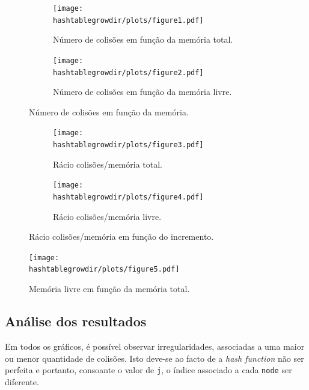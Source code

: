 \documentclass[portuguese,11pt,a4paper,titlepage]{article}
\newcommand{\srcdir}{..}
\newcommand{\hashtablegrowdir}{\srcdir/hash\_table\_grow-test}
\begin{document}
\begin{figure}[h]
	\begin{subfigure}{0.47\textwidth}
		\texttt{[image: \\hashtablegrowdir/plots/figure1.pdf]} 
		\caption{Número de colisões em função da memória total.}
		\label{fig:htg_col_mem_total}
	\end{subfigure}
	\hspace{0.049\textwidth}
	\begin{subfigure}{0.47\textwidth}
		\texttt{[image: \\hashtablegrowdir/plots/figure2.pdf]}
		\caption{Número de colisões em função da memória livre.}
		\label{fig:htg_col_mem_free}
	\end{subfigure}
	
	\caption{Número de colisões em função da memória.}
	\label{fig:htg_col_mem}
\end{figure}

\begin{figure}[h]
	\begin{subfigure}{0.47\textwidth}
		\texttt{[image: \\hashtablegrowdir/plots/figure3.pdf]} 
		\caption{Rácio colisões/memória total.}
		\label{fig:htg_ratio_inc_total}
	\end{subfigure}
	\hspace{0.049\textwidth}
	\begin{subfigure}{0.47\textwidth}
		\texttt{[image: \\hashtablegrowdir/plots/figure4.pdf]}
		\caption{Rácio colisões/memória livre.}
		\label{fig:htg_ratio_inc_free}
	\end{subfigure}
	
	\caption{Rácio colisões/memória em função do incremento.}
	\label{fig:htg_ratio_inc}
\end{figure}

\begin{figure}[ht]
	\centering
	\texttt{[image: \\hashtablegrowdir/plots/figure5.pdf]}
	\caption{Memória livre em função da memória total.}
	\label{fig:htg_free_total}
\end{figure}

\subsection{Análise dos resultados}
Em todos os gráficos, é possível observar irregularidades, associadas a uma maior ou menor quantidade de colisões. Isto deve-se ao facto de a \textit{hash function} não ser perfeita e portanto, consoante o valor de \lstinline|j|, o índice associado a cada \lstinline|node| ser diferente.
\end{document}
